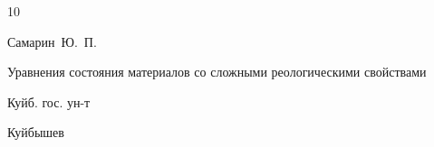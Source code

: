 \begin{thebibliography}{10}








\by Самарин~Ю.~П.

\book Уравнения состояния материалов со сложными реологическими свойствами


\publ Куйб. гос. ун-т

\publaddr Куйбышев




























\end{thebibliography}
